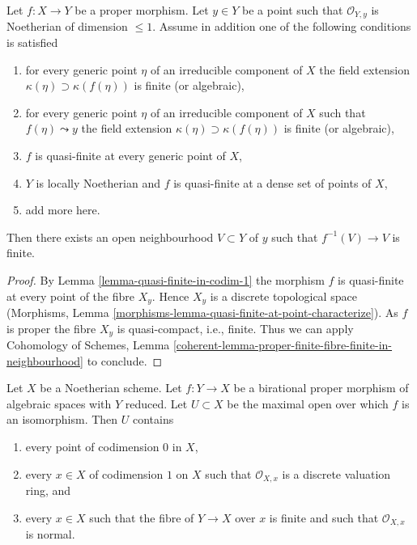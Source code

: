 \begin{lemma}
\label{lemma-finite-in-codim-1}
Let $f : X \to Y$ be a proper morphism. Let $y \in Y$ be a point
such that $\mathcal{O}_{Y, y}$ is Noetherian of dimension $\leq 1$.
Assume in addition one of the following conditions is satisfied
\begin{enumerate}
\item for every generic point $\eta$ of an irreducible component
of $X$ the field extension $\kappa(\eta) \supset \kappa(f(\eta))$
is finite (or algebraic),
\item for every generic point $\eta$ of an irreducible component
of $X$ such that $f(\eta) \leadsto y$ the field extension
$\kappa(\eta) \supset \kappa(f(\eta))$ is finite (or algebraic),
\item $f$ is quasi-finite at every generic point of $X$,
\item $Y$ is locally Noetherian and $f$
is quasi-finite at a dense set of points of $X$,
\item add more here.
\end{enumerate}
Then there exists an open neighbourhood $V \subset Y$ of $y$ such that
$f^{-1}(V) \to V$ is finite.
\end{lemma}

\begin{proof}
By Lemma \ref{lemma-quasi-finite-in-codim-1} the morphism $f$ is
quasi-finite at every point of the fibre $X_y$. Hence
$X_y$ is a discrete topological space
(Morphisms, Lemma \ref{morphisms-lemma-quasi-finite-at-point-characterize}).
As $f$ is proper the fibre $X_y$ is quasi-compact, i.e., finite.
Thus we can apply Cohomology of Schemes, Lemma
\ref{coherent-lemma-proper-finite-fibre-finite-in-neighbourhood}
to conclude.
\end{proof}

\begin{lemma}
\label{lemma-modification-normal-iso-over-codimension-1}
Let $X$ be a Noetherian scheme. Let $f : Y \to X$ be a birational proper
morphism of algebraic spaces with $Y$ reduced. Let $U \subset X$ be the
maximal open over which $f$ is an isomorphism. Then $U$ contains
\begin{enumerate}
\item every point of codimension $0$ in $X$,
\item every $x \in X$ of codimension $1$ on $X$ such that
$\mathcal{O}_{X, x}$ is a discrete valuation ring, and
\item every $x \in X$ such that the fibre of $Y \to X$ over $x$ is
finite and such that $\mathcal{O}_{X, x}$ is normal.
\end{enumerate}
\end{lemma}

